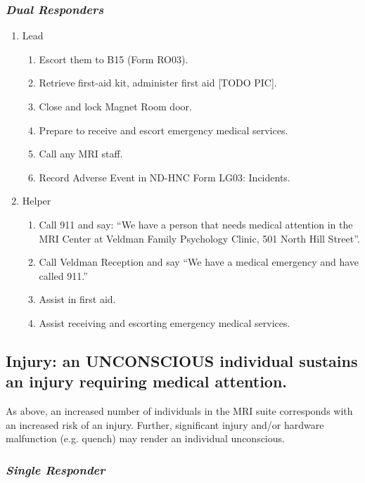 \documentclass[11pt]{article}
\begin{document}
\subsubsection*{\textit{Dual Responders}}

\begin{enumerate}
	\item Lead
	\begin{enumerate}
		\item Escort them to B15 (Form RO03).
		\item Retrieve first-aid kit, administer first aid [TODO PIC].
		\item Close and lock Magnet Room door.
		\item Prepare to receive and escort emergency medical services.
		\item Call any MRI staff.
		\item Record Adverse Event in ND-HNC Form LG03: Incidents.
	\end{enumerate}

	\item Helper
	\begin{enumerate}
		\item Call 911 and say: ``We have a person that needs medical attention in the MRI Center at Veldman Family Psychology Clinic, 501 North Hill Street''.
		\item Call Veldman Reception and say ``We have a medical emergency and have called 911.''
		\item Assist in first aid.
		\item Assist receiving and escorting emergency medical services.
	\end{enumerate}
\end{enumerate}


\subsection{Injury: an \textbf{UNCONSCIOUS} individual sustains an injury requiring medical attention.}
\label{ssec:injury-uncons}

As above, an increased number of individuals in the MRI suite corresponds with an increased risk of an injury. Further, significant injury and/or hardware malfunction (e.g. quench) may render an individual unconscious.

\subsubsection*{\textit{Single Responder}}
\end{document}
